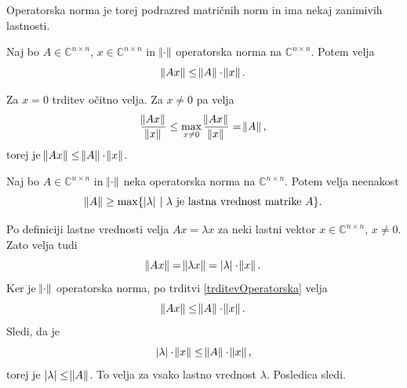 \documentclass[mat1]{fmfdelo}
\newcommand{\C}{\mathbb C}
\begin{document}
Operatorska norma je torej podrazred matričnih norm in ima nekaj zanimivih lastnosti.
\begin{trditev}\label{trditevOperatorska}
    Naj bo $A \in \C^{n \times n}$, $x \in \C^{n \times n}$ in $\norm{\cdot}$ operatorska norma na $\C^{n \times n}$. Potem velja
    \begin{equation*}
        \norm{A x} \leq \norm{A} \cdot \norm{x}.
    \end{equation*}
\end{trditev}
\begin{dokaz}
    Za $x = 0$ trditev očitno velja. Za $x \neq 0$ pa velja
    \begin{equation*}
        \frac{\norm{A x}}{\norm{x}} \leq \max_{x \neq 0} \frac{\norm{A x}}{\norm{x}} = \norm{A},
    \end{equation*}
    torej je $\norm{A x} \leq \norm{A} \cdot \norm{x}$.
\end{dokaz}
\begin{posledica}\label{posledicaOperatorskaNorma}
    Naj bo $A \in \C^{n \times n}$ in $\norm{\cdot}$ neka operatorska norma na $\C^{n \times n}$. Potem velja neenakost
    \begin{equation*}
        \norm{A} \geq \max\{|\lambda|\ |\ \lambda\  \text{je lastna vrednost matrike}\  A\}.
    \end{equation*}
\end{posledica}
\begin{dokaz}
    Po definiciji lastne vrednosti velja $A x = \lambda x$ za neki lastni vektor $x \in \C^{n \times n}$, $x \neq 0 $. Zato velja tudi
    \begin{equation*}
        \norm{A x} = \norm{\lambda x} = |\lambda|\cdot \norm{x}.
    \end{equation*}    
    Ker je $\norm{\cdot}$ operatorska norma, po trditvi \ref{trditevOperatorska} velja
    \begin{equation*}
        \norm{A x} \leq \norm{A} \cdot \norm{x}.
    \end{equation*}
    Sledi, da je
    \begin{equation*}
        |\lambda|\cdot \norm{x} \leq \norm{A} \cdot \norm{x},
    \end{equation*}
    torej je $|\lambda| \leq \norm{A}$. To velja za vsako lastno vrednost $\lambda$. Posledica sledi.
\end{dokaz}
\end{document}
